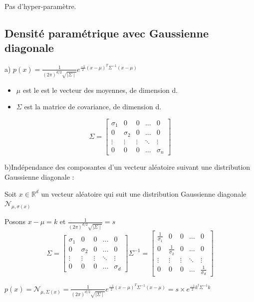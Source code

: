 \documentclass[a4paper,10pt]{article}
\begin{document}
Pas d'hyper-paramètre.


\subsection{Densité paramétrique avec Gaussienne diagonale}

a) $p(x) = \frac{1}{(2 \pi)^{d/2} \sqrt{\mid{\Sigma} \mid}} e^{\frac{-1}{2} (x- \mu)^{T} \Sigma^{-1} (x- \mu) }$
\begin{itemize}
	\item $\mu$ est le est le vecteur des moyennes, de dimension d.
	\item $\Sigma$ est la matrice de covariance, de dimension d.
\end{itemize}

\[
\Sigma =
\begin{bmatrix}
    \sigma_{1} & 0 & 0 & \dots  & 0 \\
    0 & \sigma_{2} & 0 & \dots  & 0 \\
    \vdots & \vdots & \vdots & \ddots & \vdots \\
    0 & 0 & 0 & \dots  & \sigma_{n}
\end{bmatrix}
\]

b)Indépendance des composantes d'un vecteur aléatoire suivant une distribution Gaussienne diagonale :

Soit $x \in \mathds{R}^{d}$ un vecteur aléatoire qui suit une distribution Gaussienne diagonale $\mathcal{N}_{\mu , \sigma(x)}$

Posons $x - \mu = k$ et $\frac{1}{(2 \pi)^{d/2} \sqrt{\mid{\Sigma} \mid}} = s$
\[
\Sigma =
\begin{bmatrix}
    \sigma_{1} & 0 & 0 & \dots  & 0 \\
    0 & \sigma_{2} & 0 & \dots  & 0 \\
    \vdots & \vdots & \vdots & \ddots & \vdots \\
    0 & 0 & 0 & \dots  & \sigma_{d}
\end{bmatrix}
\Sigma^{-1} =
\begin{bmatrix}
    \frac{1}{\sigma_{1}} & 0 & 0 & \dots  & 0 \\
    0 & \frac{1}{\sigma_{2}} & 0 & \dots  & 0 \\
    \vdots & \vdots & \vdots & \ddots & \vdots \\
    0 & 0 & 0 & \dots  & \frac{1}{\sigma_{d}}
\end{bmatrix}
\]

$p(x) = \mathcal{N}_{\mu , \Sigma(x)} = \frac{1}{(2 \pi)^{d/2} \sqrt{\mid{\Sigma} \mid}} e^{\frac{-1}{2} (x- \mu)^{T} \Sigma^{-1} (x- \mu) } = s \times e^{\frac{-1}{2} k^{t} \Sigma^{-1} k }$
\end{document}
